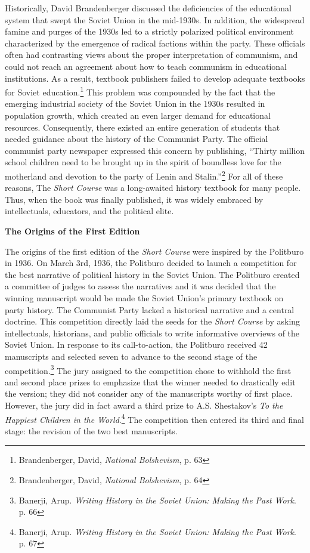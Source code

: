 \documentclass[a4paper, twocolumn]{article}
\begin{document}
Historically, David Brandenberger discussed the deficiencies of the
educational system that swept the Soviet Union in the mid-1930s. In
addition, the widespread famine and purges of the 1930s led to a
strictly polarized political environment characterized by the
emergence of radical factions within the party. These officials often
had contrasting views about the proper interpretation of communism, and
could not reach an agreement about how to teach communism in
educational institutions. As a result, textbook publishers failed to
develop adequate textbooks for Soviet education.\footnote{ Brandenberger, David, \emph{National Bolshevism}, p. 63} This problem was
compounded by the fact that the emerging industrial society of the
Soviet Union in the 1930s resulted in population growth, which created
an even larger demand for educational resources. Consequently,
there existed an entire generation of students that needed guidance
about the history of the Communist Party. The official communist party
newspaper expressed this concern by publishing, ``Thirty million
school children need to be brought up in the spirit of boundless love
for the motherland and devotion to the party of Lenin and Stalin.''\footnote{ Brandenberger, David, \emph{National Bolshevism}, p. 64}
For all of these reasons, The \emph{Short Course} was a long-awaited history
textbook for many people. Thus, when the book was finally published,
it was widely embraced by intellectuals, educators, and the political
elite.


\begin{center}\textbf{The Origins of the First Edition}\end{center}

The origins of the first edition of the \emph{Short Course} were inspired by
the Politburo in 1936. On March 3rd, 1936, the Politburo decided to
launch a competition for the best narrative of political history in
the Soviet Union. The Politburo created a committee of judges to
assess the narratives and it was decided that the winning manuscript
would be made the Soviet Union's primary textbook on party
history. The Communist Party lacked a historical narrative and a central
doctrine.
  This competition directly laid the seeds for the \emph{Short Course} by
  asking intellectuals, historians, and public officials to write
  informative overviews of the Soviet Union. In response to its call-to-action, the Politburo received 42 manuscripts and selected seven
  to advance to the second stage of the competition.\footnote{Banerji, Arup. \emph{Writing History in the Soviet Union: Making the Past Work}. p. 66} The jury
  assigned to the competition chose to withhold the first and second
  place prizes to emphasize that the winner needed to drastically edit
  the version; they did not consider any of the manuscripts worthy of
  first place.  However, the jury did in fact award a third prize to
  A.S. Shestakov's \emph{To the Happiest Children in the World}.\footnote{Banerji, Arup. \emph{Writing History in the Soviet Union: Making the Past Work}. p. 67} The
  competition then entered its third and final stage: the revision of
  the two best manuscripts.
\end{document}
